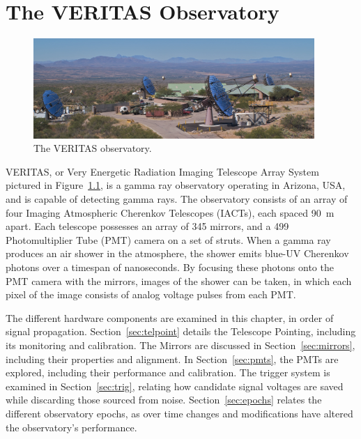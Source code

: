 \cleartooddpage[\thispagestyle{empty}]
\chapter{The VERITAS Observatory}\label{chapter:veritas}

\begin{figure}[ht]
  \centering
  \includegraphics[width=0.95\textwidth]{images/veritas_array_v6}
  \caption[VERITAS Array]{
    The VERITAS observatory.}
  \label{fig:veritasarray}
\end{figure}

VERITAS, or Very Energetic Radiation Imaging Telescope Array System pictured in Figure~\ref{fig:veritasarray}, is a gamma ray observatory operating in Arizona, USA, and is capable of detecting \nicetilde{}\TeV{} gamma rays.
The observatory consists of an array of four Imaging Atmospheric Cherenkov Telescopes (IACTs), each spaced \nicetilde{}\SI{90}{m} apart.
Each telescope possesses an array of 345 mirrors, and a 499 Photomultiplier Tube (PMT) camera on a set of struts.
When a gamma ray produces an air shower in the atmosphere, the shower emits blue-UV Cherenkov photons over a timespan of nanoseconds.
By focusing these photons onto the PMT camera with the mirrors, images of the shower can be taken, in which each pixel of the image consists of analog voltage pulses from each PMT.


The different hardware components are examined in this chapter, in order of signal propagation.
Section~\ref{sec:telpoint} details the Telescope Pointing, including its monitoring and calibration.
The Mirrors are discussed in Section~\ref{sec:mirrors}, including their properties and alignment.
In Section~\ref{sec:pmts}, the PMTs are explored, including their performance and calibration.
The trigger system is examined in Section~\ref{sec:trig}, relating how candidate signal voltages are saved while discarding those sourced from noise.
Section~\ref{sec:epochs} relates the different observatory epochs, as over time changes and modifications have altered the observatory's performance.


